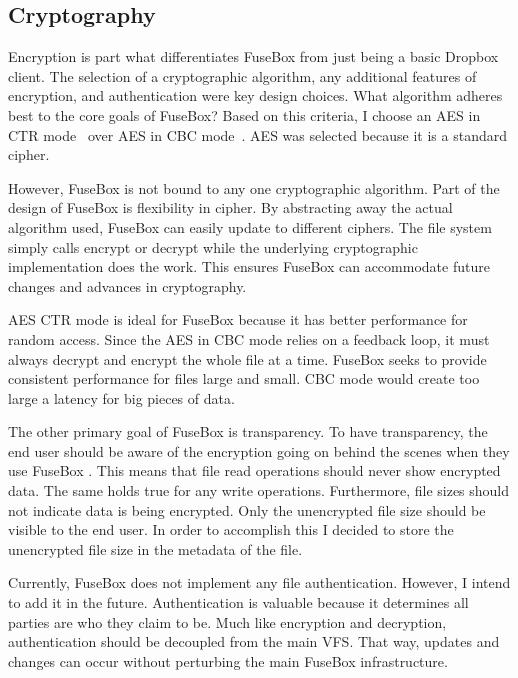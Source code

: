 \documentclass[11pt,twocolumn,letterpaper]{article}
\newcommand{\appname}{FuseBox }
\newcommand{\appnameWOspace}{FuseBox}
\begin{document}
\subsection{Cryptography}
\label{sec:enc}
Encryption is part what differentiates \appname from just being a basic
Dropbox client. The selection of a cryptographic algorithm,
any additional features of encryption, and authentication were key design choices. What
algorithm adheres best to the core goals of \appnameWOspace? Based on
this criteria, I choose an AES in CTR mode~\cite{AESCTR} over AES in
CBC mode~\cite{CBC}. AES was selected because it is a standard cipher. 
\par However, \appname is not bound to any one cryptographic algorithm. 
Part of the design of \appname is
flexibility in cipher. By abstracting away the actual algorithm used,
\appname can easily update to different ciphers. The file system
simply calls encrypt or decrypt while the underlying cryptographic
implementation does the work. This ensures \appname can accommodate 
future changes and advances in cryptography. 
\par AES CTR mode is ideal for \appname because it has better
performance for random access. Since the AES in CBC mode relies on a 
feedback loop, it must always decrypt and encrypt
the whole file at a time. \appname seeks to provide consistent
performance for files large and small. CBC mode would create
too large a latency for big pieces of data.   
\par The other primary goal of \appname is transparency. To have
transparency, the end user should be aware of the encryption going on
behind the scenes when they use \appname. This means that file read
operations should never show encrypted data. The same holds true for
any write operations. Furthermore, file sizes should not indicate 
data is being encrypted. Only the unencrypted file size should be
visible to the end user. In order to
accomplish this I decided to store the unencrypted file size in the
metadata of the file. 
\par Currently, \appname does not implement any file
authentication. However, I intend to add it in the future. Authentication is
valuable because it determines all parties are who they claim to
be. Much like encryption and decryption, authentication should be
decoupled from the main VFS. That way, updates and changes 
can occur without perturbing the main \appname infrastructure. 
\end{document}
